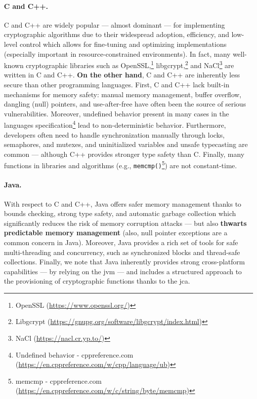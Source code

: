 \paragraph*{C and C++.} C and C++ are widely popular --- almost dominant --- for implementing cryptographic algorithms due to their widespread adoption, efficiency, and low-level control which allows for fine-tuning and optimizing implementations (especially important in resource-constrained environments). In fact, many well-known cryptographic libraries such as OpenSSL,\footnote{OpenSSL (\url{https://www.openssl.org/})} libgcrypt,\footnote{Libgcrypt (\url{https://gnupg.org/software/libgcrypt/index.html})} and NaCl\footnote{NaCl (\url{https://nacl.cr.yp.to/})} are written in C and C++. \textbf{On the other hand}, C and C++ are inherently less secure than other programming languages. First, C and C++ lack built-in mechanisms for memory safety: manual memory management, buffer overflow, dangling (null) pointers, and use-after-free have often been the source of serious vulnerabilities. Moreover, undefined behavior present in many cases in the languages specification\footnote{Undefined behavior - cppreference.com (\url{https://en.cppreference.com/w/cpp/language/ub})} lead to non-deterministic behavior. Furthermore, developers often need to handle synchronization manually through locks, semaphores, and mutexes, and uninitialized variables and unsafe typecasting are common --- although C++ provides stronger type safety than C. Finally, many functions in libraries and algorithms (e.g., \texttt{memcmp()}\footnote{memcmp - cppreference.com (\url{https://en.cppreference.com/w/c/string/byte/memcmp})}) are not constant-time.


\paragraph*{Java.} With respect to C and C++, Java offers safer memory management thanks to bounds checking, strong type safety, and automatic garbage collection which significantly reduces the risk of memory corruption attacks --- but also \textbf{thwarts predictable memory management} (also, null pointer exceptions are a common concern in Java). Moreover, Java provides a rich set of tools for safe multi-threading and concurrency, such as synchronized blocks and thread-safe collections. Finally, we note that Java inherently provides strong cross-platform capabilities --- by relying on the \gls{jvm} --- and includes a structured approach to the provisioning of cryptographic functions thanks to the \gls{jca}.

